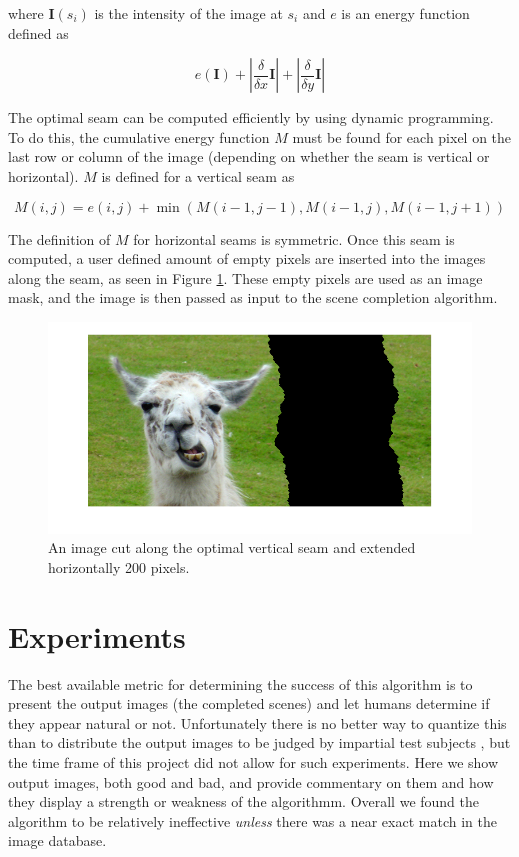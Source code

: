 \documentclass[11pt]{amsart}
\begin{document}
where $\mathbf{I}(s_i)$ is the intensity of the image at $s_i$ and $e$ is an energy function defined as

$$
e(\mathbf{I}) + |\frac{\delta}{\delta x} \mathbf{I} | + | \frac{\delta}{\delta y} \mathbf{I} |
$$ 

The optimal seam can be computed efficiently by using dynamic programming. To do this, the cumulative energy function $M$ must be found for each pixel on the last row or column of the image (depending on
whether the seam is vertical or horizontal). $M$ is defined for a vertical seam as

$$
M(i,j) = e(i,j) + \min(M(i-1,j-1), M(i-1, j), M(i-1, j+1))
$$

The definition of $M$ for horizontal seams is symmetric. Once this seam is computed, a user defined amount
of empty pixels are inserted into the images along the seam, as seen in Figure \ref{llamaCut}. These empty pixels are used as an image mask, and the image is then passed as input to the scene completion algorithm.

\begin{figure}[htbp]
\begin{center}
\includegraphics[scale=.4]{broken.png}
\caption{An image cut along the optimal vertical seam and extended horizontally 200 pixels.}
\label{llamaCut}
\end{center}
\end{figure}


\section{Experiments}

The best available metric for determining the success of this algorithm is to present the output images (the completed scenes) and let humans determine if they appear natural or not. Unfortunately there is no better way to quantize this than to distribute the output images to be judged by impartial test subjects \cite{Hays:2007}, but the time frame of this project did not allow for such experiments. Here we show output images, both good and bad, and provide commentary on them and how they display a strength or weakness of the algorithmm. Overall we found the algorithm to be relatively ineffective \emph{unless} there was a near exact match in the image database.
\end{document}
